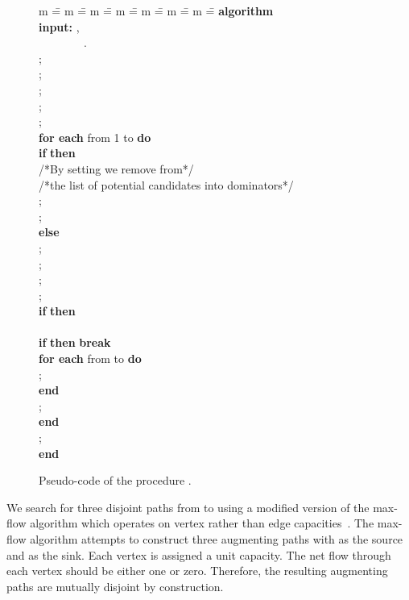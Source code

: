 \documentclass{llncs}
\newcommand{\ALGORITHM}{\textbf{algorithm} }
\newcommand{\ELSE}{\textbf{else} }
\newcommand{\END}{\textbf{end} }
\newcommand{\DO}{\textbf{do} }
\newcommand{\FOREACH}{\textbf{for each} }
\newcommand{\IF}{\textbf{if} }
\newcommand{\THEN}{\textbf{then} }
\newcommand{\BREAK}{\textbf{break} }
\newcommand{\INPUT}{\textbf{input:} }
\begin{document}
\begin{figure}[t!]
\begin{center}
\parbox{0cm} 
{
\begin{tabbing}
m \== m \== m \== m \== m \== m \== m \== \kill
\ALGORITHM  \\
\INPUT ,\\
~~~~~~~~.\\
\> ; \\
\> ; \\
\> ; \\
\> ; \\
\> ; \\
\> \FOREACH  from 1 to  \DO \\
\> \> \IF  \THEN \\
\> \> \> /*By setting  we remove  from*/ \\
\> \> \> /*the list of potential candidates into dominators*/ \\
\> \> \> ; \\
\> \> \> ;\\
\> \> \ELSE \\
\> \> \> ; \\
\> \> \> ;\\
\> \> \> ;\\
\> \> ; \\
\> \> \IF  \THEN \\
\> \> ~~~~~~~~~~~~~~~~~~~~~~~~~~~~~   \\
\> \> \IF  \THEN \BREAK  \\
\> \> \FOREACH  from  to  \DO \\
\> \> \> ; \\
\> \> \END \\
\> \> ; \\
\> \END \\
\> ;\\
\END
\end{tabbing}
}
\caption{Pseudo-code of the procedure .}\label{ddom_code2}
\end{center}
\end{figure}

We search for three disjoint paths from  to
 using a modified version of the max-flow algorithm which 
operates on vertex rather than edge capacities~\cite{TeD04c}. 
The max-flow algorithm attempts to construct three augmenting
paths with  as the source and  as the sink. 
Each vertex is assigned a unit capacity. 
The net flow through each vertex should be either one or zero.
Therefore, the resulting augmenting paths are mutually disjoint by
construction. 
\end{document}
